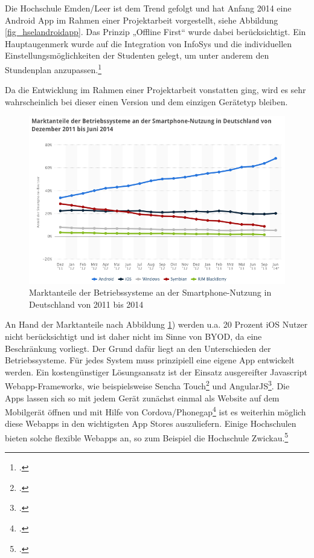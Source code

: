 Die Hochschule Emden/Leer ist dem Trend gefolgt und hat Anfang 2014 eine Android App im Rahmen einer Projektarbeit vorgestellt, siehe Abbildung \ref{fig_hselandroidapp}. Das Prinzip „Offline First“ wurde dabei berücksichtigt. Ein Hauptaugenmerk wurde auf die Integration von InfoSys und die individuellen Einstellungsmöglichkeiten der Studenten gelegt, um unter anderem den Stundenplan anzupassen.\footcite{hsel_immer_up_to_date_2014}

Da die Entwicklung im Rahmen einer Projektarbeit vonstatten ging, wird es sehr wahrscheinlich bei dieser einen Version und dem einzigen Gerätetyp bleiben.

\begin{figure}[h!]
	\centering
	\includegraphics[width=\textwidth]{kapitel/gruppe1_2/bilder/marktanteile}
	\caption{Marktanteile der Betriebssysteme an der Smartphone-Nutzung in Deutschland von 2011 bis 2014\protect\footnotemark}
	\label{fig_marktanteile}
\end{figure}

An Hand der Marktanteile nach Abbildung \ref{fig_marktanteile}) werden u.a. 20 Prozent iOS Nutzer nicht berücksichtigt und ist daher nicht im Sinne von BYOD, da eine Beschränkung vorliegt. Der Grund dafür liegt an den Unterschieden der Betriebssysteme. Für jedes System muss prinzipiell eine eigene App entwickelt werden. Ein kostengünstiger Lösungsansatz ist der Einsatz ausgereifter Javascript Webapp-Frameworks, wie beispielsweise Sencha Touch\footcite{sencha_touch_2015} und AngularJS\footcite{angularjs_2015}. Die Apps lassen sich so mit jedem Gerät zunächst einmal als Website auf dem Mobilgerät öffnen und mit Hilfe von Cordova/Phonegap\footcite{apache_cordova_2013} ist es weiterhin möglich diese Webapps in den wichtigsten App Stores auszuliefern. Einige Hochschulen bieten solche flexible Webapps an, so zum Beispiel die Hochschule Zwickau.\footcite{whz_webapp_2015}

